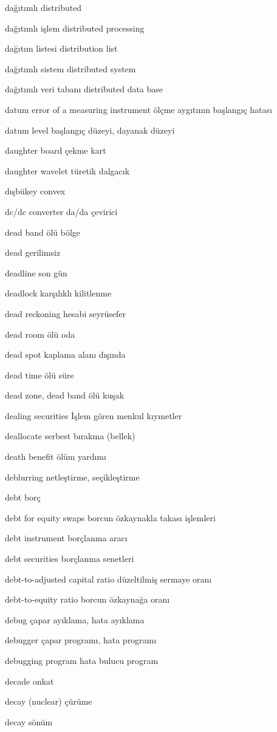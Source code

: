 \documentclass[12pt,fleqn]{article}\usepackage{../../common}
\begin{document}
dağıtımlı distributed

dağıtımlı işlem distributed processing

dağıtım listesi distribution list

dağıtımlı sistem distributed system

dağıtımlı veri tabanı distributed data base

datum error of a measuring instrument ölçme aygıtının başlangıç hatası

datum level başlangıç düzeyi, dayanak düzeyi

daughter board çekme kart

daughter wavelet türetik dalgacık

dışbükey convex

dc/dc converter da/da çevirici

dead band ölü bölge

dead gerilimsiz

deadline son gün

deadlock karşılıklı kilitlenme

dead reckoning hesabi seyrüsefer

dead room ölü oda

dead spot kaplama alanı dışında

dead time ölü süre

dead zone, dead band ölü kuşak

dealing securities İşlem gören menkul kıymetler

deallocate serbest bırakma (bellek)

death benefit ölüm yardımı

deblurring netleştirme, seçikleştirme

debt borç

debt for equity swaps borcun özkaynakla takası işlemleri

debt instrument borçlanma aracı

debt securities borçlanma senetleri

debt-to-adjusted capital ratio düzeltilmiş sermaye oranı

debt-to-equity ratio borcun özkaynağa oranı

debug çapar ayıklama, hata ayıklama

debugger çapar programı, hata programı

debugging program hata bulucu program

decade onkat

decay (nuclear) çürüme

decay sönüm
\end{document}

